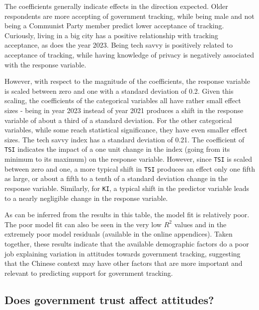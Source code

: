 \documentclass[
  number]{elsarticle}
\begin{document}
The coefficients generally indicate effects in the direction expected.
Older respondents are more accepting of government tracking, while being
male and not being a Communist Party member predict lower acceptance of
tracking. Curiously, living in a big city has a positive relationship
with tracking acceptance, as does the year 2023. Being tech savvy is
positively related to acceptance of tracking, while having knowledge of
privacy is negatively associated with the response variable.

However, with respect to the magnitude of the coefficients, the response
variable is scaled between zero and one with a standard deviation of
0.2. Given this scaling, the coefficients of the categorical variables
all have rather small effect sizes - being in year 2023 instead of year
2021 produces a shift in the response variable of about a third of a
standard deviation. For the other categorical variables, while some
reach statistical significance, they have even smaller effect sizes. The
tech savvy index has a standard deviation of 0.21. The coefficient of
\texttt{TSI} indicates the impact of a one unit change in the index
(going from its minimum to its maximum) on the response variable.
However, since \texttt{TSI} is scaled between zero and one, a more
typical shift in \texttt{TSI} produces an effect only one fifth as
large, or about a fifth to a tenth of a standard deviation change in the
response variable. Similarly, for \texttt{KI}, a typical shift in the
predictor variable leads to a nearly negligible change in the response
variable.

As can be inferred from the results in this table, the model fit is
relatively poor. The poor model fit can also be seen in the very low
\(R^2\) values and in the extremely poor model residuals (available in
the online appendices). Taken together, these results indicate that the
available demographic factors do a poor job explaining variation in
attitudes towards government tracking, suggesting that the Chinese
context may have other factors that are more important and relevant to
predicting support for government tracking.

\subsection{Does government trust affect
attitudes?}\label{does-government-trust-affect-attitudes}
\end{document}
